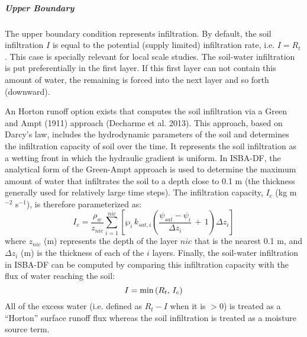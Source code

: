 \subparagraph{Upper Boundary}
%
The upper boundary condition represents infiltration.
%
By default, the soil infiltration $I$ is equal to the
potential (supply limited) infiltration rate, i.e. $I = R_t$. 
This case is specially relevant for local scale
studies. 
The soil-water infiltration is put preferentially in the first layer. If
this first layer can not contain this amount of water, the remaining
is forced into the next layer and so forth (downward).

An Horton runoff option exists that computes the soil infiltration via
a Green and Ampt (1911) approach (Decharme et al. 2013)\nocite{decharme_ea_2013}. 
This approach, based on Darcy’s law, includes the hydrodynamic parameters
of the soil and determines the infiltration capacity of soil over the
time. It represents the soil infiltration as a wetting front in which
the hydraulic gradient is uniform. In ISBA-DF, the analytical form of the
Green-Ampt approach is used to determine the maximum amount of water
that infiltrates the soil to a depth close to 0.1 m (the thickness
generally used for relatively large time steps). 
The infiltration capacity, $I_c$
(kg m$^{-2}$ s$^{-1}$), is therefore parameterized as:
%
\begin{equation}
\label{eq:infiltration_capacity}
%
I_c = \frac{\rho_w}{z_{nic}} \sum_{i=1}^{nic}
\left[
\wp_i \, k_{sat,i}
\left(
\frac{\psi_{sat}-\psi_{i}}{\Delta z_i} \,+\, 1
\right) \Delta z_i
\right]
\end{equation}
%
where $z_{nic}$ (m) 
represents the depth of the layer $nic$ that is the nearest 0.1 m, and 
$\Delta z_i$ (m) is the thickness of each of the $i$ layers. 
Finally, the soil-water
infiltration in ISBA-DF can be computed by comparing this infiltration
capacity with the flux of water reaching the soil:
%
\begin{equation}
\label{eq:upperwaterbc_nosubgrid}
%
I = {\rm min}\left(R_t, \, I_c \right)
\end{equation}
%
All of the excess water (i.e. defined as $R_t-I$ when it is $>0$) 
is treated as a “Horton” surface runoff flux
whereas the soil infiltration is treated as a moisture source term.

